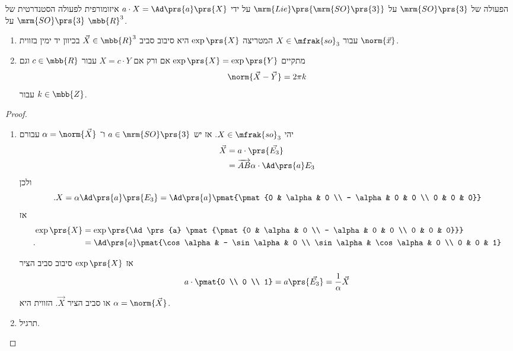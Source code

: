 \documentclass[10pt, twoside]{book}
\begin{document}
\begin{remark}
הפעולה של
$\mrm{SO}\prs{3}$
על
$\mrm{Lie}\prs{\mrm{SO}\prs{3}}$
על ידי
$a \cdot X = \Ad\prs{a}\prs{X}$
איזומורפית לפעולה הסטנדרטית של
$\mrm{SO}\prs{3}$
על
$\mbb{R}^3$.
\end{remark}

\begin{proposition}
\begin{enumerate}
\item עבור
$X \in \mfrak{so}_3$
המטריצה
$\exp\prs{X}$
היא סיבוב סביב
$\vec{X} \in \mbb{R}^3$
בכיוון יד ימין בזווית
$\norm{\vec{x}}$.
\item מתקיים
$\exp\prs{X} = \exp\prs{Y}$
אם ורק אם
$X = c \cdot Y$
עבור
$c \in \mbb{R}$
וגם
\[\norm{\vec{X} - \vec{Y}} = 2 \pi k\]
עבור
$k \in \mbb{Z}$.
\end{enumerate}
\end{proposition}

\begin{proof}
\begin{enumerate}
\item יהי
$X \in \mfrak{so}_3$.
אז יש
$a \in \mrm{SO}\prs{3}$
ו־%
$\alpha = \norm{\vec{X}}$
עבורם
\begin{align*}
\vec{X} &= a \cdot \prs{\vec{E_3}}
\\&=
\overrightarrow{AB}{\alpha \cdot \Ad\prs{a} E_3}
\end{align*}
ולכן
\[\text{.} X = \alpha \Ad\prs{a} \prs{E_3} = \Ad\prs{a} \pmat{\pmat{0 & \alpha & 0 \\ - \alpha & 0 & 0 \\ 0 & 0 & 0}}\]
אז
\begin{align*}
\exp\prs{X} &=
\exp\prs{\Ad\prs{a} \pmat{\pmat{0 & \alpha & 0 \\ - \alpha & 0 & 0 \\ 0 & 0 & 0}}}
\\
\text{.} \hphantom{\exp\prs{X}} &= \Ad\prs{a} \pmat{\cos\alpha & - \sin \alpha & 0 \\ \sin \alpha & \cos \alpha & 0 \\ 0 & 0 & 1}
\end{align*}

אז
$\exp\prs{X}$
סיבוב סביב הציר
\[a \cdot \pmat{0 \\ 0 \\ 1} = a\prs{\vec{E_3}} = \frac{1}{\alpha} \vec{X}\]
או סביב הציר
$\vec{X}$.
הזווית היא
$\alpha = \norm{\vec{X}}$.

\item
תרגיל.
\end{enumerate}
\end{proof}
\end{document}
